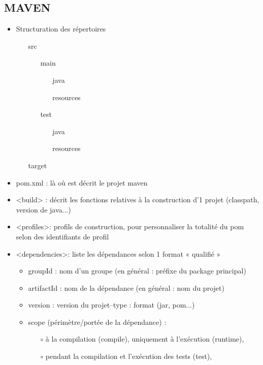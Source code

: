 \documentclass[11pt,twoside,a4paper]{article}
\begin{document}
\begin{landscape}
\begin{multicols}{2}
	\section*{MAVEN}
	\begin{itemize}
		\item Structuration des r{\'e}pertoires
		\begin{itemize}
			\item[] src
			\begin{itemize}
				\item[] main
				\begin{itemize}
					\item[] java
					\item[] resources
				\end{itemize}
				\item[] test
				\begin{itemize}
					\item[] java
					\item[] resources
				\end{itemize}
			\end{itemize}
			\item[] target
		\end{itemize}
		\item[] 
		\item pom.xml : l{\`a} o{\`u} est d{\'e}crit le projet maven
		\item <build> : d{\'e}crit les fonctions relatives {\`a} la construction d'1 projet (classpath, version de java...)
		\item <profiles>: profils de construction, pour personnaliser la totalit{\'e} du pom selon des identifiants de profil
		\item <dependencies>: liste les d{\'e}pendances selon 1 format « qualifi{\'e} »
		\begin{itemize}
			\item groupId : nom d'un groupe (en g{\'e}n{\'e}ral : pr{\'e}fixe du package principal)
			\item artifactId : nom de la d{\'e}pendance (en g{\'e}n{\'e}ral : nom du projet)
			\item version : version du projet–type : format (jar, pom...)
			\item scope (p{\'e}rim{\`e}tre/port{\'e}e de la d{\'e}pendance) : 
			\begin{itemize}
				\item[$\circ$] {\`a} la compilation (compile), uniquement {\`a} l'ex{\'e}cution (runtime), 
				\item[$\circ$] pendant la compilation et l'ex{\'e}cution des tests (test), 

\end{itemize}
\end{itemize}
\end{itemize}
\end{multicols}
\end{landscape}
\end{document}
